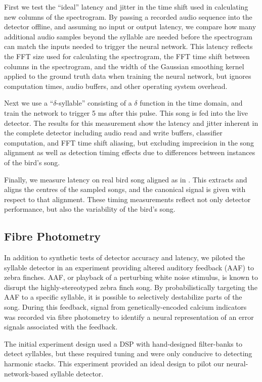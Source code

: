 \documentclass[10pt,letterpaper]{article}
\begin{document}
First we test the ``ideal'' latency and jitter in the time shift used
in calculating new columns of the spectrogram. By passing a recorded
audio sequence into the detector offline, and assuming no input or
output latency, we compare how many additional audio samples beyond
the syllable are needed before the spectrogram can match the inputs
needed to trigger the neural network.  This latency reflects the FFT
size used for calculating the spectrogram, the FFT time shift between
columns in the spectrogram, and the width of the Gaussian smoothing
kernel applied to the ground truth data when training the neural
network, but ignores computation times, audio buffers, and other
operating system overhead.

Next we use a ``$\delta$-syllable'' consisting of a $\delta$ function
in the time domain, and train the network to trigger 5 ms after this
pulse.  This song is fed into the live detector.  The results for this
measurement show the latency and jitter inherent in the complete
detector including audio read and write buffers, classifier
computation, and FFT time shift aliasing, but excluding imprecision in
the song alignment as well as detection timing effects due to
differences between instances of the bird's song.

Finally, we measure latency on real bird song aligned as in
\cite{Poole2012}.  This extracts and aligns the centres of the sampled
songs, and the canonical signal is given with respect to that
alignment.  These timing measurements reflect not only detector
performance, but also the variability of the bird's song.

\subsection{Fibre Photometry}
\label{sec:fp-methods}

In addition to synthetic tests of detector accuracy and 
latency, we piloted the syllable detector in an experiment
providing altered auditory feedback (AAF) to zebra finches. AAF, or 
playback of a perturbing white noise stimulus, is known to disrupt 
the highly-stereotyped zebra finch song. By probabilistically 
targeting the AAF to a specific syllable, it is possible 
to selectively destabilize parts of the song. During this 
feedback, signal from genetically-encoded calcium indicators was 
recorded via fibre photometry to identify a neural representation of 
an error signals associated with the feedback.

The initial experiment design used a DSP with hand-designed filter-banks to
detect syllables, but these required tuning and were only conducive
to detecting harmonic stacks. This experiment provided an ideal design
to pilot our neural-network-based syllable detector.
\end{document}

